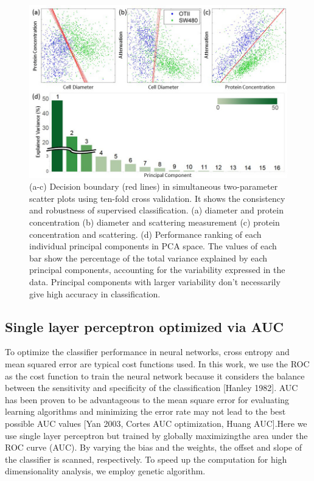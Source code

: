 \documentclass[aps,pra,preprint,superscriptaddress]{revtex4-1}
\begin{document}
\begin{figure}
\includegraphics[scale=0.55]{FigurePCA.jpg}
\caption{\label{fig:PCA} (a-c) Decision boundary (red lines) in simultaneous two-parameter scatter plots using ten-fold cross validation. It shows the consistency and robustness of supervised classification. (a) diameter and protein concentration (b) diameter and scattering measurement (c) protein concentration and scattering. (d) Performance ranking of each individual principal components in PCA space. The values of each bar show the percentage of the total variance explained by each principal components, accounting for the variability expressed in the data. Principal components with larger variability don’t necessarily give high accuracy in classification.}
\end{figure}

\subsection{Single layer perceptron optimized via AUC}

To optimize the classifier performance in neural networks, cross entropy and mean squared error are typical cost functions used. In this work, we use the ROC as the cost function to train the neural network because it considers the balance between the sensitivity and specificity of the classification [Hanley 1982]. AUC has been proven to be advantageous to the mean square error for evaluating learning algorithms \cite{verrelst1998use} and minimizing the error rate may not lead to the best possible AUC values [Yan 2003, Cortes AUC optimization, Huang AUC].Here we use single layer perceptron but trained by globally maximizingthe area under the ROC curve (AUC). By varying the bias and the weights, the offset and slope of the classifier is scanned, respectively. To speed up the computation for high dimensionality analysis, we employ genetic algorithm. 
\end{document}

